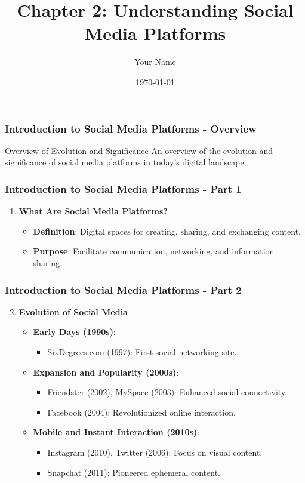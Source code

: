 \documentclass{beamer}
\title{Chapter 2: Understanding Social Media Platforms}
\author{Your Name}
\institute{Your Institution}
\date{\today}
\begin{document}
\frame{\titlepage}

\begin{frame}[fragile]
    \frametitle{Introduction to Social Media Platforms - Overview}
    \begin{block}{Overview of Evolution and Significance}
        An overview of the evolution and significance of social media platforms in today's digital landscape. 
    \end{block}
\end{frame}

\begin{frame}[fragile]
    \frametitle{Introduction to Social Media Platforms - Part 1}
    \begin{enumerate}
        \item \textbf{What Are Social Media Platforms?}
        \begin{itemize}
            \item \textbf{Definition}: Digital spaces for creating, sharing, and exchanging content.
            \item \textbf{Purpose}: Facilitate communication, networking, and information sharing.
        \end{itemize}
    \end{enumerate}
\end{frame}

\begin{frame}[fragile]
    \frametitle{Introduction to Social Media Platforms - Part 2}
    \begin{enumerate}
        \setcounter{enumi}{1}
        \item \textbf{Evolution of Social Media}
        \begin{itemize}
            \item \textbf{Early Days (1990s)}: 
            \begin{itemize}
                \item SixDegrees.com (1997): First social networking site.
            \end{itemize}
            \item \textbf{Expansion and Popularity (2000s)}:
            \begin{itemize}
                \item Friendster (2002), MySpace (2003): Enhanced social connectivity.
                \item Facebook (2004): Revolutionized online interaction.
            \end{itemize}
            \item \textbf{Mobile and Instant Interaction (2010s)}:
            \begin{itemize}
                \item Instagram (2010), Twitter (2006): Focus on visual content.
                \item Snapchat (2011): Pioneered ephemeral content.
            \end{itemize}
        \end{itemize}
    \end{enumerate}
\end{frame}
\end{document}
